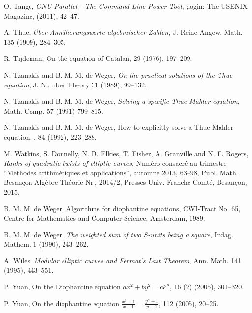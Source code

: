 \begin{thebibliography}{}
O. Tange,
\emph{GNU Parallel - The Command-Line Power Tool},
;login: The USENIX Magazine, (2011), 42--47.

A. Thue,
\emph{\"Uber Ann\"aherungswerte algebraischer Zahlen},
J. Reine Angew. Math. 135 (1909), 284--305.

R. Tijdeman,
\newblock On the equation of Catalan, 
 29 (1976), 197--209.

N. Tzanakis and B. M. M. de Weger,
\emph{On the practical solutions of the Thue equation},
J. Number Theory 31 (1989), 99--132.

N. Tzanakis and B. M. M. de Weger, 
\emph{Solving a specific Thue-Mahler equation},
Math. Comp. 57 (1991) 799--815.

N. Tzanakis and B. M. M. de Weger, 
\newblock How to explicitly solve a Thue-Mahler equation,
. 84 (1992), 223--288.

M. Watkins, S. Donnelly, N. D. Elkies, T. Fisher, A. Granville and N. F. Rogers, 
\emph{Ranks of quadratic twists of elliptic curves},
Num\'ero consacr\'e au trimestre ``M\'ethodes arithm\'etiques et applications'', automne 2013, 63--98, Publ. Math. Besan\c{c}on Alg\`ebre Th\'eorie Nr., 2014/2, Presses Univ. Franche-Comt\'e, Besan\c{c}on, 2015. 

B. M. M. de Weger,
\newblock Algorithms for diophantine equations,
\newblock CWI-Tract No. 65, Centre for Mathematics and Computer Science, Amsterdam, 1989.

B. M. M. de Weger,
\emph{The weighted sum of two $S$-units being a square},
Indag. Mathem. 1 (1990), 243--262.

A. Wiles,
\emph{Modular elliptic curves and Fermat's Last Theorem},
Ann. Math. 141 (1995), 443--551.

P. Yuan,
\newblock On the Diophantine equation $ax^2+by^2=ck^n$,
 16 (2) (2005), 301--320.

P. Yuan,
\newblock On the diophantine equation $\frac{x^3-1}{x-1}=\frac{y^n-1}{y-1}$,
 112 (2005), 20--25.

\end{thebibliography}


\endinput

Any text after an \endinput is ignored.
You could put scraps here or things in progress.

